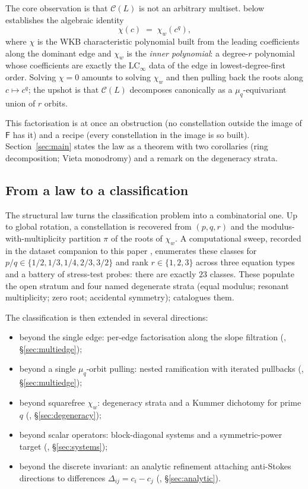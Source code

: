 \documentclass[11pt,a4paper]{article}
\theoremstyle{plain}
\theoremstyle{definition}
\theoremstyle{remark}
\newcommand{\LCinf}{\mathrm{LC}_\infty}
\newcommand{\Cl}{\mathcal{C}}
\newcommand{\Fclass}{\mathsf{F}}
\newcommand{\Dij}{\Delta_{ij}}
\begin{document}
The core observation is that $\Cl(L)$ is not an arbitrary multiset.
 below establishes the algebraic identity
\[
   \chi(c) \;=\; \chi_w(c^q),
\]
where $\chi$ is the WKB characteristic polynomial built from the leading
coefficients along the dominant edge and $\chi_w$ is the \emph{inner
polynomial}: a degree-$r$ polynomial whose coefficients are exactly the
$\LCinf$ data of the edge in lowest-degree-first order. Solving $\chi = 0$
amounts to solving $\chi_w$ and then pulling back the roots along
$c \mapsto c^q$; the upshot is that $\Cl(L)$ decomposes canonically as a
$\mu_q$-equivariant union of $r$ orbits.

This factorisation is at once an obstruction (no constellation outside the
image of $\Fclass$ has it) and a recipe (every constellation in the image
is so built). Section~\ref{sec:main} states the law as a theorem with two
corollaries (ring decomposition; Vieta monodromy) and a remark on the
degeneracy strata.

\subsection{From a law to a classification}\label{ssec:intro-classification}

The structural law turns the classification problem into a combinatorial
one. Up to global rotation, a constellation is recovered from $(p, q, r)$
and the modulus-with-multiplicity partition $\pi$ of the roots of $\chi_w$.
A computational sweep, recorded in the dataset companion to this paper
\cite{wkb_dataset_v1}, enumerates these classes for
$p/q \in \{1/2, 1/3, 1/4, 2/3, 3/2\}$ and rank $r \in \{1, 2, 3\}$ across
three equation types and a battery of stress-test probes: there are exactly
$23$ classes. These populate the open stratum and four named degenerate
strata (equal modulus; resonant multiplicity; zero root; accidental
symmetry);  catalogues them.

The classification is then extended in several directions:
\begin{itemize}[leftmargin=*]
\item beyond the single edge: per-edge factorisation along the slope
      filtration (, \S\ref{sec:multiedge});
\item beyond a single $\mu_q$-orbit pulling: nested ramification with
      iterated pullbacks (, \S\ref{sec:multiedge});
\item beyond squarefree $\chi_w$: degeneracy strata and a Kummer
      dichotomy for prime $q$ (, \S\ref{sec:degeneracy});
\item beyond scalar operators: block-diagonal systems and a symmetric-power
      target (, \S\ref{sec:systems});
\item beyond the discrete invariant: an analytic refinement attaching
      anti-Stokes directions to differences $\Dij = c_i - c_j$
      (, \S\ref{sec:analytic}).
\end{itemize}
\end{document}
